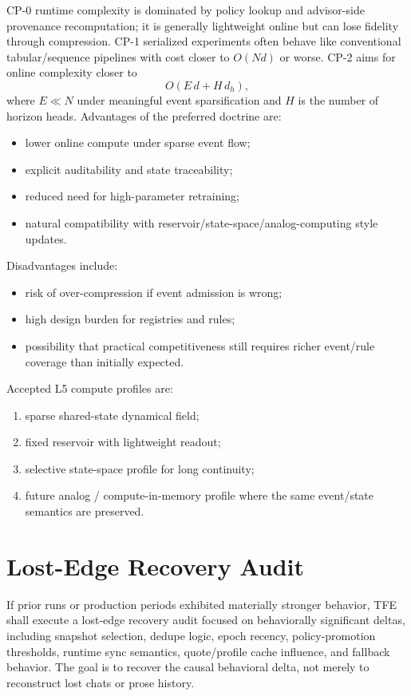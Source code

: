 CP-0 runtime complexity is dominated by policy lookup and advisor-side provenance recomputation; it is generally lightweight online but can lose fidelity through compression. CP-1 serialized experiments often behave like conventional tabular/sequence pipelines with cost closer to $O(Nd)$ or worse. CP-2 aims for online complexity closer to
\[
O(E\,d + H\,d_h),
\]
where $E\ll N$ under meaningful event sparsification and $H$ is the number of horizon heads. Advantages of the preferred doctrine are:
\begin{itemize}
    \item lower online compute under sparse event flow;
    \item explicit auditability and state traceability;
    \item reduced need for high-parameter retraining;
    \item natural compatibility with reservoir/state-space/analog-computing style updates.
\end{itemize}
Disadvantages include:
\begin{itemize}
    \item risk of over-compression if event admission is wrong;
    \item high design burden for registries and rules;
    \item possibility that practical competitiveness still requires richer event/rule coverage than initially expected.
\end{itemize}
Accepted L5 compute profiles are:
\begin{enumerate}[leftmargin=1.2cm]
    \item sparse shared-state dynamical field;
    \item fixed reservoir with lightweight readout;
    \item selective state-space profile for long continuity;
    \item future analog / compute-in-memory profile where the same event/state semantics are preserved.
\end{enumerate}

\section{Lost-Edge Recovery Audit}

If prior runs or production periods exhibited materially stronger behavior, TFE shall execute a lost-edge recovery audit focused on behaviorally significant deltas, including snapshot selection, dedupe logic, epoch recency, policy-promotion thresholds, runtime sync semantics, quote/profile cache influence, and fallback behavior. The goal is to recover the causal behavioral delta, not merely to reconstruct lost chats or prose history.
